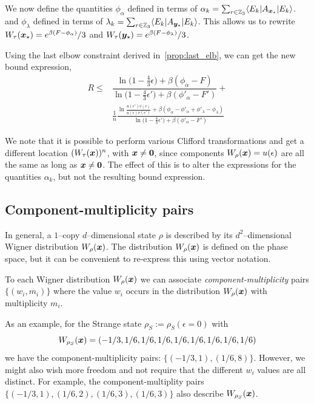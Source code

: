 \documentclass[pra,
aps,
twocolumn,
superscriptaddress,
groupedaddress,
nofootinbib,
reprint
]{revtex4-1}
\begin{document}
We now define the quantities $\phi_\alpha$ defined in terms of $\alpha_k = \sum_{r \in \mathbb{Z}_3} \langle E_k |A_{\bm{x}_\star} |E_k\rangle$. and $\phi_\lambda$ defined in terms of $\lambda_k = \sum_{r \in \mathbb{Z}_3} \langle E_k |A_{\bm{y}_\star} |E_k\rangle$.
This allows us to rewrite $W_{\tau}(\bm{x}_\star) = {e^{\beta (F - \phi_\alpha)}}/{3}$ and $W_{\tau}(\bm{y}_\star) = {e^{\beta (F - \phi_\lambda)}}/{3}$.

Using the last elbow constraint derived in~\cref{prop:last_elb}, we can get the new bound expression,
\begin{equation}
	\begin{split}
	R \leq &\dfrac{\ln{\big( 1-\frac{4}{3}\epsilon \big)} + \beta (\phi_\alpha - F)}{\ln{\big( 1-\frac{4}{3}\epsilon' \big)} + \beta (\phi'_\alpha - F')} + \\
	&\frac{1}{n}\frac{\ln{\frac{u(\epsilon')v(\epsilon)}{u(\epsilon)v(\epsilon')}}+\beta(\phi_\alpha - \phi'_\alpha + \phi'_\lambda - \phi_\lambda)}{\ln{\big( 1-\frac{4}{3}\epsilon' \big)} + \beta (\phi'_\alpha - F')}
	\end{split}
\end{equation}

We note that it is possible to perform various Clifford transformations and get a different location $(W_{\tau}(\bm{x}))^n$, with $\bm{x} \neq \bm{0}$, since components $W_{\rho}(\bm{x}) = u(\epsilon)$ are all the same as long as $\bm{x} \neq \bm{0}$.
The effect of this is to alter the expressions for the quantities $\alpha_k$, but not the resulting bound expression.








\subsection{Component-multiplicity pairs}
\label{app:cmpairs}

In general, a $1$--copy $d$--dimensional state $\rho$ is described by its $d^2$--dimensional Wigner distribution $\W{\rho}(\bmx)$. 
The distribution $\W{\rho}(\bmx)$ is defined on the phase space, but it can be convenient to re-express this using vector notation. 

To each Wigner distribution $W_\rho(\boldsymbol{x})$ we can associate \emph{component-multiplicity} pairs $\{(w_i, m_i)\}$ where the value $w_i$ occurs in the distribution $W_\rho(\boldsymbol{x})$ with multiplicity $m_i$.

As an example, for the Strange state $\rho_S := \rho_S(\epsilon=0)$ with
\begin{equation}
W_{\rho_S}(\boldsymbol{x}) = (-1/3, 1/6,  1/6,  1/6,  1/6,  1/6,  1/6,  1/6,  1/6)
\end{equation}
we have the component-multiplicity pairs: $\{( -1/3, 1), ( 1/6, 8)\}$. However, we might also wish more freedom and not require that the different $w_i$ values are all distinct. For example, the component-multiplity pairs $\{(-1/3, 1), (1/6, 2), (1/6, 3), (1/6, 3)\}$ also describe $W_{\rho_S}(\boldsymbol{x})$.
\end{document}
